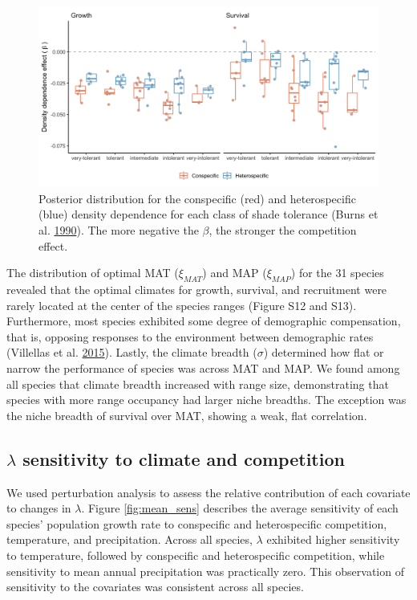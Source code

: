 \documentclass[12pt]{article}
\begin{document}
\begin{figure}
\hypertarget{fig:crossComp}{%
\centering
\includegraphics[width=1\textwidth,height=\textheight]{manuscript/figs/crossComp.png}
\caption{Posterior distribution for the conspecific (red) and
heterospecific (blue) density dependence for each class of shade
tolerance (Burns et al. \protect\hyperlink{ref-burns1990silvics}{1990}).
The more negative the \(\beta\), the stronger the competition
effect.}\label{fig:crossComp}
}
\end{figure}

The distribution of optimal MAT (\(\xi_{MAT}\)) and MAP (\(\xi_{MAP}\))
for the 31 species revealed that the optimal climates for growth,
survival, and recruitment were rarely located at the center of the
species ranges (Figure S12 and S13). Furthermore, most species exhibited
some degree of demographic compensation, that is, opposing responses to
the environment between demographic rates (Villellas et al.
\protect\hyperlink{ref-Villellas2015}{2015}). Lastly, the climate
breadth (\(\sigma\)) determined how flat or narrow the performance of
species was across MAT and MAP. We found among all species that climate
breadth increased with range size, demonstrating that species with more
range occupancy had larger niche breadths. The exception was the niche
breadth of survival over MAT, showing a weak, flat correlation.

\hypertarget{lambda-sensitivity-to-climate-and-competition}{%
\subsection{\texorpdfstring{\(\lambda\) sensitivity to climate and
competition}{\textbackslash lambda sensitivity to climate and competition}}\label{lambda-sensitivity-to-climate-and-competition}}

We used perturbation analysis to assess the relative contribution of
each covariate to changes in \(\lambda\). Figure \ref{fig:mean_sens}
describes the average sensitivity of each species' population growth
rate to conspecific and heterospecific competition, temperature, and
precipitation. Across all species, \(\lambda\) exhibited higher
sensitivity to temperature, followed by conspecific and heterospecific
competition, while sensitivity to mean annual precipitation was
practically zero. This observation of sensitivity to the covariates was
consistent across all species.
\end{document}

